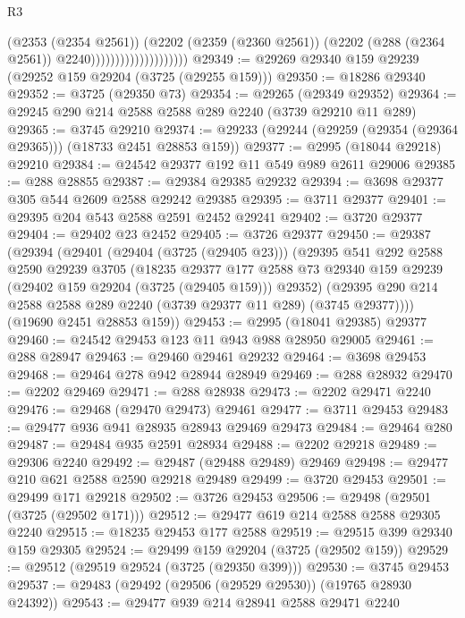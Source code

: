 \begin{lexlean}{R3}
\begin{coremodule}
                                        (@2353 (@2354 @2561))
                                        (@2202
                                          (@2359 (@2360 @2561))
                                          (@2202 (@288 (@2364 @2561)) @2240))))))))))))))))))))
@29349 := @29269 @29340 @159 @29239 (@29252 @159 @29204 (@3725 (@29255 @159)))
@29350 := @18286 @29340
@29352 := @3725 (@29350 @73)
@29354 := @29265 (@29349 @29352)
@29364 := @29245 @290 @214 @2588 @2588 @289 @2240 (@3739 @29210 @11 @289)
@29365 := @3745 @29210
@29374 := @29233 (@29244 (@29259 (@29354 (@29364 @29365))) (@18733 @2451 @28853 @159))
@29377 := @2995 (@18044 @29218) @29210
@29384 := @24542 @29377 @192 @11 @549 @989 @2611 @29006
@29385 := @288 @28855
@29387 := @29384 @29385 @29232
@29394 := @3698 @29377 @305 @544 @2609 @2588 @29242 @29385
@29395 := @3711 @29377
@29401 := @29395 @204 @543 @2588 @2591 @2452 @29241
@29402 := @3720 @29377
@29404 := @29402 @23 @2452
@29405 := @3726 @29377
@29450 := @29387
    (@29394
      (@29401
        (@29404 (@3725 (@29405 @23)))
        (@29395
          @541
          @292
          @2588
          @2590
          @29239
          @3705
          (@18235
            @29377
            @177
            @2588
            @73
            @29340
            @159
            @29239
            (@29402 @159 @29204 (@3725 (@29405 @159)))
            @29352)
          (@29395 @290 @214 @2588 @2588 @289 @2240 (@3739 @29377 @11 @289) (@3745 @29377))))
      (@19690 @2451 @28853 @159))
@29453 := @2995 (@18041 @29385) @29377
@29460 := @24542 @29453 @123 @11 @943 @988 @28950 @29005
@29461 := @288 @28947
@29463 := @29460 @29461 @29232
@29464 := @3698 @29453
@29468 := @29464 @278 @942 @28944 @28949
@29469 := @288 @28932
@29470 := @2202 @29469
@29471 := @288 @28938
@29473 := @2202 @29471 @2240
@29476 := @29468 (@29470 @29473) @29461
@29477 := @3711 @29453
@29483 := @29477 @936 @941 @28935 @28943 @29469 @29473
@29484 := @29464 @280
@29487 := @29484 @935 @2591 @28934
@29488 := @2202 @29218
@29489 := @29306 @2240
@29492 := @29487 (@29488 @29489) @29469
@29498 := @29477 @210 @621 @2588 @2590 @29218 @29489
@29499 := @3720 @29453
@29501 := @29499 @171 @29218
@29502 := @3726 @29453
@29506 := @29498 (@29501 (@3725 (@29502 @171)))
@29512 := @29477 @619 @214 @2588 @2588 @29305 @2240
@29515 := @18235 @29453 @177 @2588
@29519 := @29515 @399 @29340 @159 @29305
@29524 := @29499 @159 @29204 (@3725 (@29502 @159))
@29529 := @29512 (@29519 @29524 (@3725 (@29350 @399)))
@29530 := @3745 @29453
@29537 := @29483 (@29492 (@29506 (@29529 @29530)) (@19765 @28930 @24392))
@29543 := @29477 @939 @214 @28941 @2588 @29471 @2240

\end{coremodule}
\end{lexlean}
